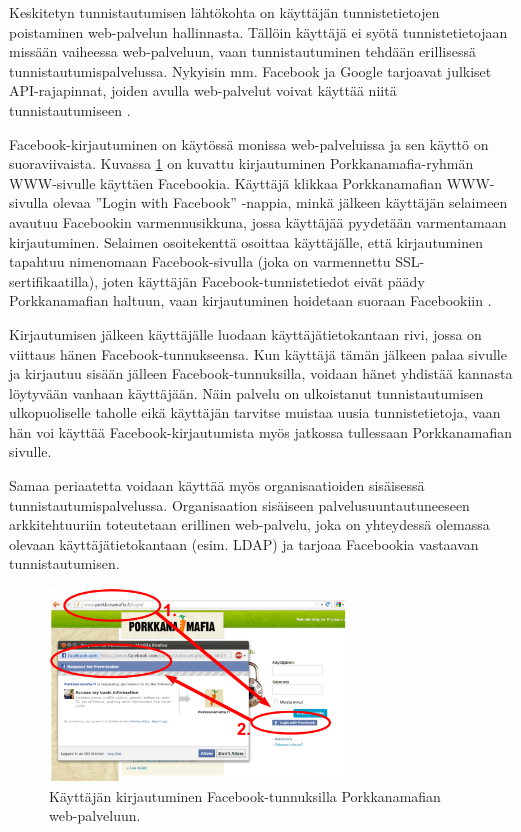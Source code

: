 Keskitetyn tunnistautumisen lähtökohta on käyttäjän tunnistetietojen poistaminen web-palvelun hallinnasta. Tällöin käyttäjä ei syötä tunnistetietojaan missään vaiheessa web-palveluun, vaan tunnistautuminen tehdään erillisessä tunnistautumispalvelussa. Nykyisin mm. Facebook ja Google tarjoavat julkiset API-rajapinnat, joiden avulla web-palvelut voivat käyttää niitä tunnistautumiseen \cite{facebook}.

Facebook-kirjautuminen on käytössä monissa web-palveluissa ja sen käyttö on suoraviivaista. Kuvassa \ref{facebook_login} on kuvattu kirjautuminen Porkkanamafia-ryhmän WWW-sivulle käyttäen Facebookia. Käyttäjä klikkaa Porkkanamafian WWW-sivulla olevaa ''Login with Facebook'' -nappia, minkä jälkeen käyttäjän selaimeen avautuu Facebookin varmennusikkuna, jossa käyttäjää pyydetään varmentamaan kirjautuminen. Selaimen osoitekenttä osoittaa käyttäjälle, että kirjautuminen tapahtuu nimenomaan Facebook-sivulla (joka on varmennettu SSL-sertifikaatilla), joten käyttäjän Facebook-tun\-nis\-te\-tie\-dot eivät päädy Porkkanamafian haltuun, vaan kirjautuminen hoidetaan suoraan Facebookiin \cite{facebook}.

Kirjautumisen jälkeen käyttäjälle luodaan käyttäjätietokantaan rivi, jossa on viittaus hänen Facebook-tunnukseensa. Kun käyttäjä tämän jälkeen palaa sivulle ja kirjautuu sisään jälleen Facebook-tunnuksilla, voidaan hänet yhdistää kannasta löytyvään vanhaan käyttäjään. Näin palvelu on ulkoistanut tunnistautumisen ulkopuoliselle taholle eikä käyttäjän tarvitse muistaa uusia tunnistetietoja, vaan hän voi käyttää Facebook-kirjautumista myös jatkossa tullessaan Porkkanamafian sivulle.

Samaa periaatetta voidaan käyttää myös organisaatioiden sisäisessä tunnistautumispalvelussa. Organisaation sisäiseen palvelusuuntautuneeseen arkkitehtuuriin toteutetaan erillinen web-palvelu, joka on yhteydessä olemassa olevaan käyttäjätietokantaan (esim. LDAP) ja tarjoaa Facebookia vastaavan tunnistautumisen.

\begin{figure}[ht]
\centering
\includegraphics[width=0.7\textwidth]{teknologiat/facebook.eps}
\caption{Käyttäjän kirjautuminen Facebook-tunnuksilla Porkkanamafian web-palveluun.}%
\label{facebook_login}
\end{figure}